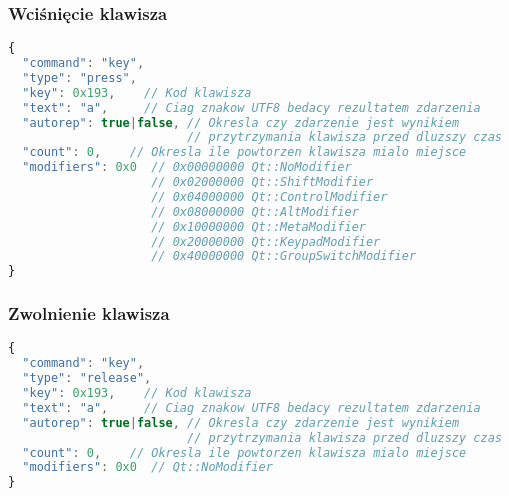 \subsubsection{Wciśnięcie klawisza}
\begin{lstlisting}[language=JavaScript,numbers=none]
{
  "command": "key",
  "type": "press", 
  "key": 0x193,    // Kod klawisza
  "text": "a",     // Ciag znakow UTF8 bedacy rezultatem zdarzenia
  "autorep": true|false, // Okresla czy zdarzenie jest wynikiem
                         // przytrzymania klawisza przed dluzszy czas
  "count": 0,    // Okresla ile powtorzen klawisza mialo miejsce
  "modifiers": 0x0  // 0x00000000 Qt::NoModifier
                    // 0x02000000 Qt::ShiftModifier
                    // 0x04000000 Qt::ControlModifier
                    // 0x08000000 Qt::AltModifier
                    // 0x10000000 Qt::MetaModifier
                    // 0x20000000 Qt::KeypadModifier
                    // 0x40000000 Qt::GroupSwitchModifier
}
\end{lstlisting}

\subsubsection{Zwolnienie klawisza}
\begin{lstlisting}[language=JavaScript,numbers=none]
{
  "command": "key",
  "type": "release", 
  "key": 0x193,    // Kod klawisza
  "text": "a",     // Ciag znakow UTF8 bedacy rezultatem zdarzenia
  "autorep": true|false, // Okresla czy zdarzenie jest wynikiem
                         // przytrzymania klawisza przed dluzszy czas
  "count": 0,    // Okresla ile powtorzen klawisza mialo miejsce
  "modifiers": 0x0  // Qt::NoModifier
}
\end{lstlisting}
 
